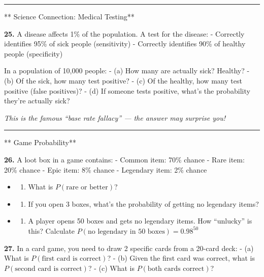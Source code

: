 \documentclass[
  11pt,
]{article}
\providecommand{\tightlist}{%
  \setlength{\itemsep}{0pt}\setlength{\parskip}{0pt}}
\begin{document}
\begin{center}\rule{0.5\linewidth}{0.5pt}\end{center}

** Science Connection: Medical Testing**

\textbf{25.} A disease affects 1\% of the population. A test for the
disease: - Correctly identifies 95\% of sick people (sensitivity) -
Correctly identifies 90\% of healthy people (specificity)

In a population of 10,000 people: - (a) How many are actually sick?
Healthy? - (b) Of the sick, how many test positive? - (c) Of the
healthy, how many test positive (false positives)? - (d) If someone
tests positive, what's the probability they're actually sick?

\emph{This is the famous ``base rate fallacy'' --- the answer may
surprise you!}

\begin{center}\rule{0.5\linewidth}{0.5pt}\end{center}

** Game Probability**

\textbf{26.} A loot box in a game contains: - Common item: 70\% chance -
Rare item: 20\% chance - Epic item: 8\% chance - Legendary item: 2\%
chance

\begin{itemize}
\item
  \begin{enumerate}
  \def\labelenumi{(\alph{enumi})}
  \tightlist
  \item
    What is \(P(\text{rare or better})\)?
  \end{enumerate}
\item
  \begin{enumerate}
  \def\labelenumi{(\alph{enumi})}
  \setcounter{enumi}{1}
  \tightlist
  \item
    If you open 3 boxes, what's the probability of getting no legendary
    items?
  \end{enumerate}
\item
  \begin{enumerate}
  \def\labelenumi{(\alph{enumi})}
  \setcounter{enumi}{2}
  \tightlist
  \item
    A player opens 50 boxes and gets no legendary items. How ``unlucky''
    is this? Calculate
    \(P(\text{no legendary in 50 boxes}) = 0.98^{50}\)
  \end{enumerate}
\end{itemize}

\textbf{27.} In a card game, you need to draw 2 specific cards from a
20-card deck: - (a) What is \(P(\text{first card is correct})\)? - (b)
Given the first card was correct, what is
\(P(\text{second card is correct})\)? - (c) What is
\(P(\text{both cards correct})\)?
\end{document}
